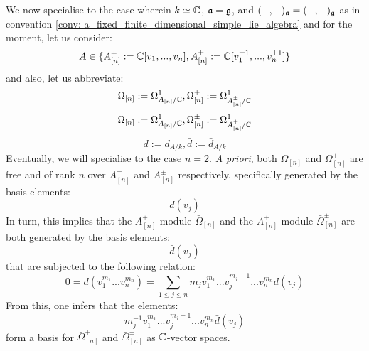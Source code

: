 \begin{remark}
                We now specialise to the case wherein $k \simeq \mathbb{C}$, $\mathfrak{a} = \mathfrak{g}$, and $(-, -)_{\mathfrak{a}} = (-, -)_{\mathfrak{g}}$ as in convention \ref{conv: a_fixed_finite_dimensional_simple_lie_algebra} and for the moment, let us consider:
                    $$A \in \{ A_{[n]}^+ := \mathbb{C}[v_1, ..., v_n], A_{[n]}^{\pm} := \mathbb{C}[v_1^{\pm 1}, ..., v_n^{\pm 1}] \}$$
                and also, let us abbreviate:
                    $$\Omega_{[n]} := \Omega^1_{A_{[n]}/\mathbb{C}}, \Omega^{\pm}_{[n]} := \Omega^1_{A_{[n]}^{\pm}/\mathbb{C}}$$
                    $$\bar{\Omega}_{[n]} := \bar{\Omega}^1_{A_{[n]}/\mathbb{C}}, \bar{\Omega}_{[n]}^{\pm} := \bar{\Omega}^1_{A_{[n]}^{\pm}/\mathbb{C}}$$
                    $$d := d_{A/k}, \bar{d} := \bar{d}_{A/k}$$
                Eventually, we will specialise to the case $n = 2$. \textit{A priori}, both $\Omega_{[n]}$ and $\Omega^{\pm}_{[n]}$ are free and of rank $n$ over $A_{[n]}^+$ and $A_{[n]}^{\pm}$ respectively, specifically generated by the basis elements:
                    $$d(v_j)$$
                In turn, this implies that the $A_{[n]}^+$-module $\bar{\Omega}_{[n]}$ and the $A_{[n]}^{\pm}$-module $\bar{\Omega}_{[n]}^{\pm}$ are both generated by the basis elements:
                    $$\bar{d}(v_j)$$
                that are subjected to the following relation:
                    $$0 = \bar{d}( v_1^{m_1} ... v_n^{m_n} ) = \sum_{1 \leq j \leq n} m_j v_1^{m_1} ... v_j^{m_j - 1} ... v_n^{m_n} \bar{d}(v_j)$$
                From this, one infers that the elements:
                    $$m_j^{-1} v_1^{m_1} ... v_j^{m_j - 1} ... v_n^{m_n} \bar{d}(v_j)$$
                form a basis for $\bar{\Omega}^+_{[n]}$ and $\bar{\Omega}_{[n]}^{\pm}$ as $\mathbb{C}$-vector spaces. 


\end{remark}
